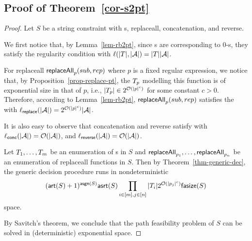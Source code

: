 



\subsection{Proof of Theorem~\ref{cor-s2pt}}
%
\begin{proof}
Let $S$ be a string constraint with \FT{}s, replaceall, concatenation, and reverse.

We first notice that, by Lemma~\ref{lem-rb2pt}, since \FT{}s are corresponding to 0-\RBPPT{}s, they satisfy the regularity condition \prerec{} with  $\ell(|T|, |\mathcal{A}|) = |T||\mathcal{A}|$. 

For replaceall  $\mathsf{replaceAll}_{p}(sub, rep)$ where $p$ is a fixed regular expression, we notice that, by Proposition~\ref{prop-replace-pt}, the \PT{} $T_p$ modelling this function is of exponential size in that of $p$, i.e., $|T_p| \in 2^{\mathcal{O}(|p|^c)}$ for some constant $c > 0$. Therefore, according to Lemma~\ref{lem-rb2pt}, $\mathsf{replaceAll}_{p}(sub, rep)$ satisfies the  \prerec{} with  $\ell_{\sf replace}(|\mathcal{A}|) =  2^{\mathcal{O}(|p|^c)} |\mathcal{A}|$.

It is also easy to observe that concatenation and reverse satisfy  \prerec{} with  $\ell_{\sf conc}(|\mathcal{A}|) = \mathcal{O}(|\mathcal{A}|)$, and $\ell_{\sf reverse}(|\mathcal{A}|) = \mathcal{O}(|\mathcal{A}|)$. 

Let $T_1, \ldots, T_m$ be an enumeration of  \FT{}s in $S$ and $\mathsf{replaceAll}_{p_1}, \ldots, \mathsf{replaceAll}_{p_n}$  be an enumeration of replaceall functions in $S$. Then by Theorem~\ref{thm-generic-dec}, 
the generic decision procedure runs in nondeterministic  
$$(\mathsf{art}(S)+1)^{\mathsf{asgn}(S)} \mathsf{asrt}(S) \prod \limits_{i \in [m], j \in [n]} |T_i| 2^{\mathcal{O}(|p_j|^c)} \mathsf{fasize}(S)$$
 space. 

By Savitch's theorem, we conclude that the path feasibility problem of $S$ can be solved in (deterministic) exponential space.
%
%
\end{proof}



